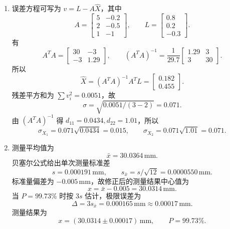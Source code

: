 \documentclass[UTF8,12pt,a4paper]{ctexart}
\begin{document}
\begin{enumerate}[label=\arabic*、]
\item 误差方程可写为 $v=L-A\hat{X}$，其中
\begin{equation*}
A=\begin{bmatrix}5&-0.2\\2&-0.5\\1&-1\end{bmatrix},\qquad
L=\begin{bmatrix}0.8\\0.2\\-0.3\end{bmatrix}.
\end{equation*}
有
\begin{equation*}
A^TA=\begin{bmatrix}30&-3\\-3&1.29\end{bmatrix},
\qquad
(A^TA)^{-1}=\frac{1}{29.7}\begin{bmatrix}1.29&3\\3&30\end{bmatrix}.
\end{equation*}
所以
\begin{equation*}
    \hat{X}=(A^TA)^{-1}A^TL=\begin{bmatrix}0.182\\0.455\end{bmatrix}.
\end{equation*}
残差平方和为 $\sum v_i^2=0.0051$，故
\begin{equation*}
    \sigma=\sqrt{0.0051/(3-2)}=0.071.
\end{equation*}
由 $(A^TA)^{-1}$ 得 $d_{11}=0.0434,d_{22}=1.01$，所以
\begin{equation*}
    \sigma_{X_1}=0.071\sqrt{0.0434}=0.015,
    \qquad
    \sigma_{X_2}=0.071\sqrt{1.01}=0.071.
\end{equation*}

\item 测量平均值为
\begin{equation*}
    \bar{x}=30.0364\,\mathrm{mm}.
\end{equation*}
贝塞尔公式给出单次测量标准差
\begin{equation*}
    s=0.000191\,\mathrm{mm},
    \qquad s_{\bar{x}}=s/\sqrt{12}=0.0000550\,\mathrm{mm}.
\end{equation*}
标准量偏差为 $-0.005\,\mathrm{mm}$，故修正后的测量结果中心值为
\begin{equation*}
    x=\bar{x}-0.005=30.0314\,\mathrm{mm}.
\end{equation*}
当 $P=99.73\%$ 时按 $3s$ 估计，极限误差为
\begin{equation*}
    \Delta=3s_{\bar{x}}=0.000165\,\mathrm{mm}\approx0.00017\,\mathrm{mm}.
\end{equation*}
测量结果为
\begin{equation*}
    x=(30.0314\pm0.00017)\,\mathrm{mm},\qquad P=99.73\%.
\end{equation*}


\end{enumerate}
\end{document}
